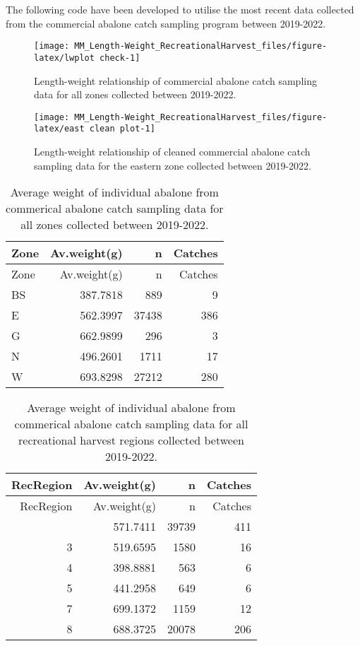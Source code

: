 \documentclass[
  11pt,
]{article}
\begin{document}
The following code have been developed to utilise the most recent data
collected from the commercial abalone catch sampling program between
2019-2022.

\begin{figure}

{\centering \texttt{[image: MM\_Length-Weight\_RecreationalHarvest\_files/figure-latex/lwplot check-1]} 

}

\caption{Length-weight relationship of commercial abalone catch sampling data for all zones collected between 2019-2022.}\label{fig:lwplot check}
\end{figure}

\begin{figure}

{\centering \texttt{[image: MM\_Length-Weight\_RecreationalHarvest\_files/figure-latex/east clean plot-1]} 

}

\caption{Length-weight relationship of cleaned commercial abalone catch sampling data for the eastern zone collected between 2019-2022.}\label{fig:east clean plot}
\end{figure}

\begin{longtable}[]{@{}lrrr@{}}
\caption{Average weight of individual abalone from commerical abalone
catch sampling data for all zones collected between
2019-2022.}\tabularnewline
\toprule\noalign{}
Zone & Av.weight(g) & n & Catches \\
\midrule\noalign{}
\endfirsthead
\toprule\noalign{}
Zone & Av.weight(g) & n & Catches \\
\midrule\noalign{}
\endhead
\bottomrule\noalign{}
\endlastfoot
BS & 387.7818 & 889 & 9 \\
E & 562.3997 & 37438 & 386 \\
G & 662.9899 & 296 & 3 \\
N & 496.2601 & 1711 & 17 \\
W & 693.8298 & 27212 & 280 \\
\end{longtable}

\begin{longtable}[]{@{}rrrr@{}}
\caption{Average weight of individual abalone from commerical abalone
catch sampling data for all recreational harvest regions collected
between 2019-2022.}\tabularnewline
\toprule\noalign{}
RecRegion & Av.weight(g) & n & Catches \\
\midrule\noalign{}
\endfirsthead
\toprule\noalign{}
RecRegion & Av.weight(g) & n & Catches \\
\midrule\noalign{}
\endhead
\bottomrule\noalign{}
\endlastfoot
1 & 571.7411 & 39739 & 411 \\
3 & 519.6595 & 1580 & 16 \\
4 & 398.8881 & 563 & 6 \\
5 & 441.2958 & 649 & 6 \\
7 & 699.1372 & 1159 & 12 \\
8 & 688.3725 & 20078 & 206 \\
\end{longtable}
\end{document}

